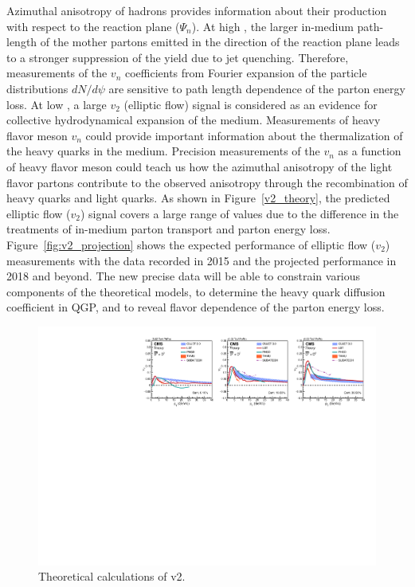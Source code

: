 Azimuthal anisotropy of hadrons provides information about their production with respect to the reaction plane ($\Psi_n$). At high \pt, the larger in-medium path-length of the mother partons emitted in the direction of the reaction plane leads to a stronger suppression of the yield due to jet quenching. Therefore, measurements of the $v_n$ coefficients from Fourier expansion of the particle distributions $dN/d\psi$ are sensitive to path length dependence of the parton energy loss. At low \pt, a large $v_2$ (elliptic flow) signal is considered as an evidence for collective hydrodynamical expansion of the medium. Measurements of heavy flavor meson $v_n$ could provide important information about the thermalization of the heavy quarks in the medium. Precision measurements of the $v_n$ as a function of heavy flavor meson \pt could teach us how the azimuthal anisotropy of the light flavor partons contribute to the observed anisotropy through the recombination of heavy quarks and light quarks. As shown in Figure~\ref{v2_theory}, the predicted elliptic flow ($v_2$) signal covers a large range of values due to the difference in the treatments of in-medium parton transport and parton energy loss. Figure~\ref{fig:v2_projection} shows the expected performance of elliptic flow ($v_2$) measurements with the data recorded in 2015 and the projected performance in 2018 and beyond. The new precise data will be able to constrain various components of the theoretical models, to determine the heavy quark diffusion coefficient in QGP, and to reveal flavor dependence of the parton energy loss.


\begin{figure}[!ht]
\begin{center}
\includegraphics[width=.98\textwidth]{figures/cTheoryV2_D_v1.pdf}
\caption{Theoretical calculations of v2.}
\label{fig:v2_theory}
\end{center}
\end{figure}

